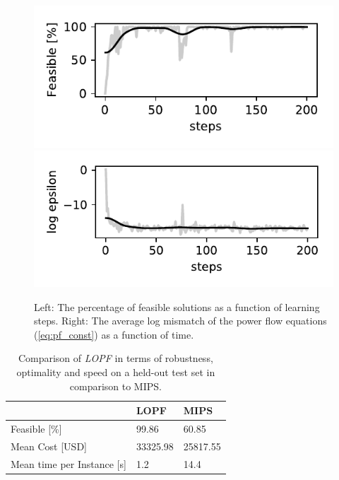 \begin{figure}[!ht]
    \centering
    \includegraphics[width=0.48\linewidth]{krtofl/violation_percentage.pdf}
    \includegraphics[width=0.48\linewidth]{krtofl/epsilon_epoch.pdf}
    \caption[LOPF: Error and feasibility as a function of learning steps.]{Left: The percentage of feasible solutions as a function of learning steps. Right: The average log mismatch of the power flow equations (\ref{eq:pf_const}) as a function of time.}
    \label{lopf:violations}
\end{figure}

\begin{table}[]
\centering
\large
\begin{tabular}{| l | l | l |}
\hline
          & LOPF & MIPS   \\
          \hline
Feasible [\%] & 99.86  & 60.85 \\
Mean Cost [USD] & 33325.98 & 25817.55\\
Mean time per Instance [s] & 1.2 & 14.4\\
\hline
\end{tabular}
\caption[LOPF: Performance comparison]{Comparison of \emph{LOPF} in terms of robustness, optimality and speed on a held-out test set in comparison to MIPS.}
\label{lopf:res_table}
\end{table}

